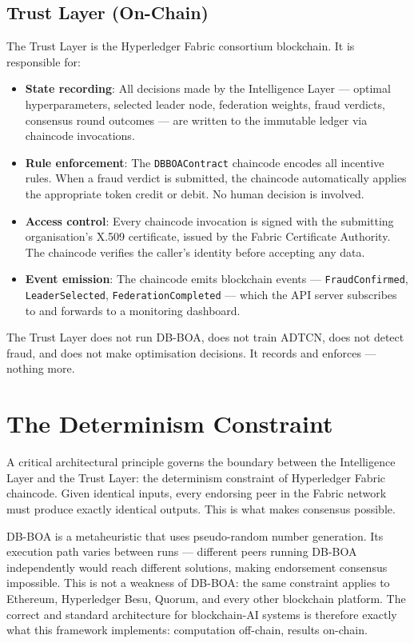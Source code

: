 \subsection{Trust Layer (On-Chain)}

The Trust Layer is the Hyperledger Fabric consortium blockchain. It is responsible for:

\begin{itemize}
  \item \textbf{State recording}: All decisions made by the Intelligence Layer — optimal hyperparameters, selected leader node, federation weights, fraud verdicts, consensus round outcomes — are written to the immutable ledger via chaincode invocations.
  \item \textbf{Rule enforcement}: The \texttt{DBBOAContract} chaincode encodes all incentive rules. When a fraud verdict is submitted, the chaincode automatically applies the appropriate token credit or debit. No human decision is involved.
  \item \textbf{Access control}: Every chaincode invocation is signed with the submitting organisation's X.509 certificate, issued by the Fabric Certificate Authority. The chaincode verifies the caller's identity before accepting any data.
  \item \textbf{Event emission}: The chaincode emits blockchain events — \texttt{FraudConfirmed}, \texttt{LeaderSelected}, \texttt{FederationCompleted} — which the API server subscribes to and forwards to a monitoring dashboard.
\end{itemize}

The Trust Layer does not run DB-BOA, does not train ADTCN, does not detect fraud, and does not make optimisation decisions. It records and enforces — nothing more.

\section{The Determinism Constraint}
\label{sec:determinism}

A critical architectural principle governs the boundary between the Intelligence Layer and the Trust Layer: the determinism constraint of Hyperledger Fabric chaincode. Given identical inputs, every endorsing peer in the Fabric network must produce exactly identical outputs. This is what makes consensus possible.

DB-BOA is a metaheuristic that uses pseudo-random number generation. Its execution path varies between runs — different peers running DB-BOA independently would reach different solutions, making endorsement consensus impossible. This is not a weakness of DB-BOA: the same constraint applies to Ethereum, Hyperledger Besu, Quorum, and every other blockchain platform. The correct and standard architecture for blockchain-AI systems is therefore exactly what this framework implements: computation off-chain, results on-chain.

